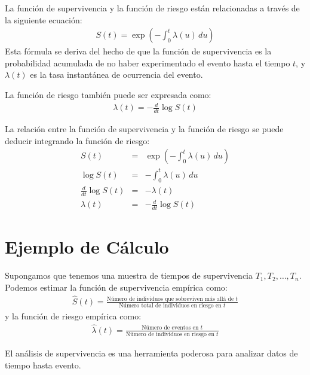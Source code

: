 \documentclass[a4paper]{report} %
\begin{document}
La funci\'on de supervivencia y la funci\'on de riesgo est\'an relacionadas a trav\'es de la siguiente ecuaci\'on:
\begin{eqnarray}
S(t) = \exp\left(-\int_0^t \lambda(u) \, du\right)
\end{eqnarray}
Esta f\'ormula se deriva del hecho de que la funci\'on de supervivencia es la probabilidad acumulada de no haber experimentado el evento hasta el tiempo $t$, y $\lambda(t)$ es la tasa instant\'anea de ocurrencia del evento.

La funci\'on de riesgo tambi\'en puede ser expresada como:
\begin{eqnarray}
\lambda(t) = -\frac{d}{dt} \log S(t)
\end{eqnarray}

La relaci\'on entre la funci\'on de supervivencia y la funci\'on de riesgo se puede deducir integrando la funci\'on de riesgo:
\begin{eqnarray*}
S(t) &=& \exp\left(-\int_0^t \lambda(u) \, du\right) \\
\log S(t) &=& -\int_0^t \lambda(u) \, du \\
\frac{d}{dt} \log S(t) &=& -\lambda(t) \\
\lambda(t) &=& -\frac{d}{dt} \log S(t)
\end{eqnarray*}

\section*{Ejemplo de C\'alculo}
Supongamos que tenemos una muestra de tiempos de supervivencia $T_1, T_2, \ldots, T_n$. Podemos estimar la funci\'on de supervivencia emp\'irica como:
\begin{eqnarray*}
\hat{S}(t) = \frac{\text{N\'umero de individuos que sobreviven m\'as all\'a de } t}{\text{N\'umero total de individuos en riesgo en } t}
\end{eqnarray*}
y la funci\'on de riesgo emp\'irica como:
\begin{eqnarray*}
\hat{\lambda}(t) = \frac{\text{N\'umero de eventos en } t}{\text{N\'umero de individuos en riesgo en } t}
\end{eqnarray*}

El an\'alisis de supervivencia es una herramienta poderosa para analizar datos de tiempo hasta evento. 
\end{document}
